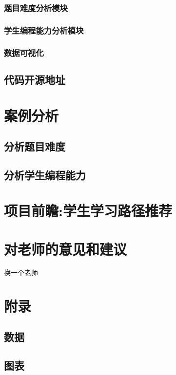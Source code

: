 \documentclass[a4paper]{article}
\begin{document}
\subsubsection{题目难度分析模块}
\subsubsection{学生编程能力分析模块}
\subsubsection{数据可视化}
\subsection{代码开源地址}
\section{案例分析}
\subsection{分析题目难度}
\subsection{分析学生编程能力}
\section{项目前瞻:学生学习路径推荐}
\section{对老师的意见和建议}
换一个老师
\section{附录}
\subsection{数据}
\subsection{图表}
\end{document}
